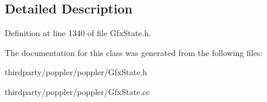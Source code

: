 \subsection{Detailed Description}


Definition at line 1340 of file Gfx\+State.\+h.



The documentation for this class was generated from the following files\+:\begin{DoxyCompactItemize}
\item 
thirdparty/poppler/poppler/Gfx\+State.\+h\item 
thirdparty/poppler/poppler/Gfx\+State.\+cc\end{DoxyCompactItemize}
